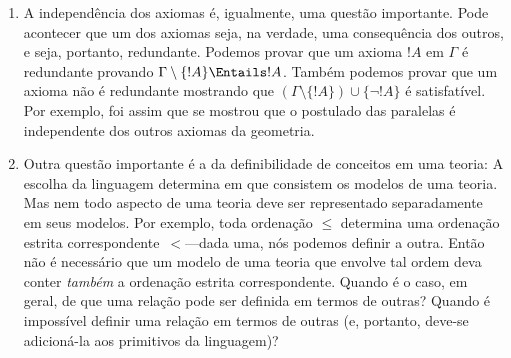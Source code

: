 \documentclass[../../../include/open-logic-section]{subfiles}
\begin{document}
\begin{explain}
\begin{enumerate}
  que obedeçam a essas leis, e teremos tentado estabelecer uma teoria
  incoerente.  Podemos verificar que isso não acontece encontrando um modelo
  de~$\Gamma$.  E se há modelos da nossa teoria, podemos usar
  métodos lógicos para investigá-los, e também podemos usar
  métodos lógicos para construir modelos.
\item A independência dos axiomas é, igualmente, uma questão
  importante.  Pode acontecer que um dos axiomas seja, na verdade, uma
  consequência dos outros, e seja, portanto, redundante.  Podemos provar que
  um axioma $!A$ em $\Gamma$ é redundante provando $\Gamma \setminus
  \{!A\} \Entails !A$.  Também podemos provar que um axioma não é
  redundante mostrando que $(\Gamma \setminus \{!A\}) \cup \{\lnot
  !A\}$ é satisfatível.  Por exemplo, foi assim que se mostrou que o
  postulado das paralelas é independente dos outros axiomas da geometria.
\item Outra questão importante é a da definibilidade de conceitos
  em uma teoria: A escolha da linguagem determina em que consistem os modelos
  de uma teoria.  Mas nem todo aspecto de uma teoria deve ser
  representado separadamente em seus modelos.  Por exemplo, toda ordenação
  $\le$ determina uma ordenação estrita correspondente~$<$---dada uma, nós
  podemos definir a outra.  Então não é necessário que um modelo de uma
  teoria que envolve tal ordem deva conter \emph{também} a
  ordenação estrita correspondente.  Quando é o caso, em geral,
  de que uma relação pode ser definida em termos de outras?  Quando é
  impossível definir uma relação em termos de outras (e, portanto, deve-se
  adicioná-la aos primitivos da linguagem)?
\end{enumerate}
\end{explain}
\end{document}
